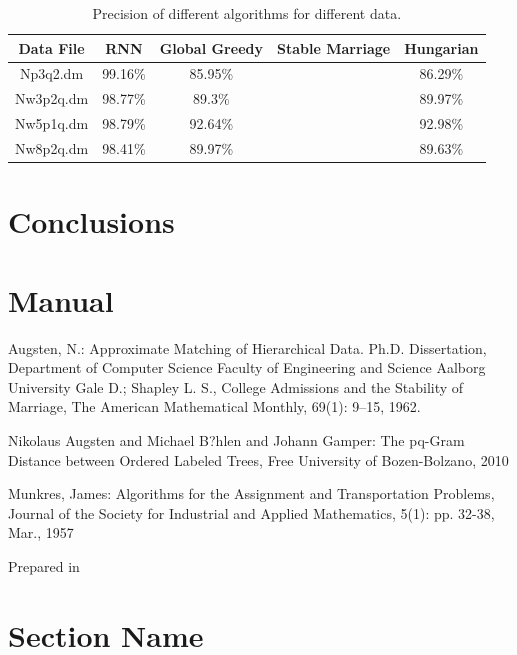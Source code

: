 \documentclass[a4paper,11pt]{article}
\begin{document}
\begin{table}[tbh]
\centering
\begin{tabular}{|c|c|c|c|c|}
\hline 
Data File & RNN & Global Greedy & Stable Marriage & Hungarian \tabularnewline
\hline 
\hline 
 Np3q2.dm & 99.16\% & 85.95\% &  & 86.29\%\tabularnewline
\hline
 Nw3p2q.dm & 98.77\% & 89.3\% &  & 89.97\%\tabularnewline
\hline 
 Nw5p1q.dm & 98.79\% & 92.64\% &  & 92.98\%\tabularnewline
\hline 
 Nw8p2q.dm & 98.41\% & 89.97\% &  & 89.63\%\tabularnewline
\hline
\end{tabular}
\caption{Precision of different algorithms for different data.}
\label{precision}
\end{table}

\section{Conclusions}

\section{Manual}


\begin{thebibliography}{9999}
Augsten, N.: Approximate Matching of Hierarchical Data. 
Ph.D. Dissertation, Department of Computer Science Faculty of Engineering and Science Aalborg University
Gale D.; Shapley L. S., College Admissions and the Stability of Marriage, The American Mathematical Monthly,  69(1): 9–15, 1962.

Nikolaus Augsten and Michael B?hlen and Johann Gamper: The pq-Gram Distance between Ordered Labeled Trees, Free University of Bozen-Bolzano, 2010 

Munkres, James: Algorithms for the Assignment and Transportation Problems, Journal of the Society for Industrial and Applied Mathematics, 5(1): pp. 32-38, Mar., 1957

\end{thebibliography}
\vfill
\begin{flushright}\small Prepared in \LaTeXe\ \end{flushright}

\appendix
\section{Section Name}
\end{document}
